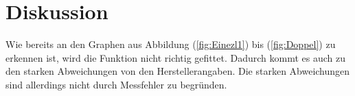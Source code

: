 \section{Diskussion}
\label{sec:Diskussion}
Wie bereits an den Graphen aus Abbildung (\ref{fig:Einezl1}) bis (\ref{fig:Doppel}) zu erkennen ist, wird die Funktion nicht richtig gefittet. Dadurch kommt es auch zu den starken Abweichungen von den Herstellerangaben. Die starken Abweichungen sind allerdings nicht durch Messfehler zu begründen.
